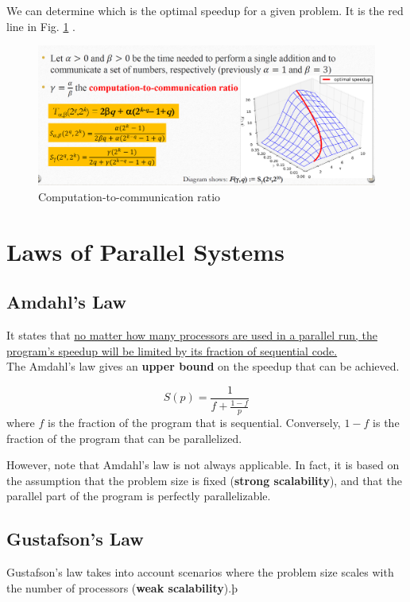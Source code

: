 We can determine which is the optimal speedup for a given problem. It is the red line in Fig. \ref{fig:06/optimal_speedup} .
\begin{figure}[htbp]
   \centering
   \includegraphics{images/06/optimal_speedup.png}
   \caption{Computation-to-communication ratio}
   \label{fig:06/optimal_speedup}
\end{figure}



\section{Laws of Parallel Systems}

\subsection{Amdahl's Law}

It states that \ul{no matter how many processors are used in a parallel run, the program's speedup will be limited by its fraction of sequential code.}\\
The Amdahl’s law gives an \textbf{upper bound} on the speedup that can be achieved.

\begin{definition}
   \begin{equation}
      S(p) = \frac{1}{f + \frac{1-f}{p}}
   \end{equation}
   where $f$ is the fraction of the program that is sequential. Conversely, $1-f$ is the fraction of the program that can be parallelized.
\end{definition}

However, note that Amdahl's law is not always applicable. In fact, it is based on the assumption that the problem size is fixed (\textbf{strong scalability}), and that the parallel part of the program is perfectly parallelizable.

\subsection{Gustafson's Law}

Gustafson's law takes into account scenarios where the problem size scales with the number of processors (\textbf{weak scalability}).þ